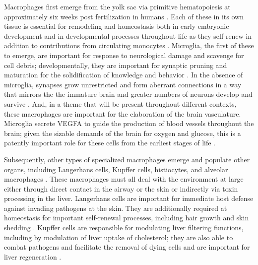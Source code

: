 Macrophages first emerge from the yolk sac via primitive hematopoiesis at approximately six weeks post fertilization in humans \citep{Geissmann2010, Yona2013, Feyaerts2022}. Each of these in its own tissue is essential for remodeling and homeostasis both in early embryonic development and in developmental processes throughout life as they self-renew in addition to contributions from circulating monocytes \citep{Jappinen2019}. Microglia, the first of these to emerge, are important for response to neurological damage and scavenge for cell debris; developmentally, they are important for synaptic pruning and maturation for the solidification of knowledge and behavior \citep{Wynn2013, Lavin2015}. In the absence of microglia, synapses grow unrestricted and form aberrant connections in a way that mirrors the the immature brain and greater numbers of neurons develop and survive \citep{Hammond2018}. And, in a theme that will be present throughout different contexts, these macrophages are important for the elaboration of the brain vasculature. Microglia secrete VEGFA to guide the production of blood vessels throughout the brain; given the sizable demands of the brain for oxygen and glucose, this is a patently important role for these cells from the earliest stages of life \citep{Dudiki2020}. 

Subsequently, other types of specialized macrophages emerge and populate other organs, including Langerhans cells, Kupffer cells, histiocytes, and alveolar macrophages \citep{Gordon2017, Davies2013a, Wynn2013, Lavin2015}. These macrophages must all deal with the environment at large either through direct contact in the airway or the skin or indirectly via toxin processing in the liver. Langerhans cells are important for immediate host defense against invading pathogens at the skin. They are additionally required at homeostasis for important self\hyp{}renewal processes, including hair growth and skin shedding \citep{Merad2008, Theret2019}. Kupffer cells are responsible for modulating liver filtering functions, including by modulation of liver uptake of cholesterol; they are also able to combat pathogens and facilitate the removal of dying cells and are important for liver regeneration \citep{Demetz2020, Theret2019}. 

